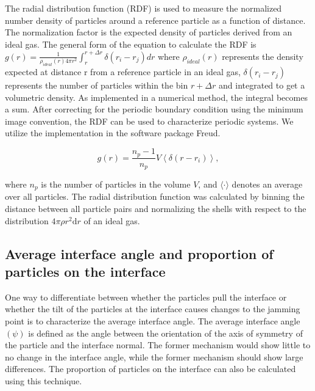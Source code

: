 The radial distribution function (RDF) is used to measure the normalized number density of particles around a 
reference particle as a function of distance. The normalization factor is the expected density of particles derived 
from an ideal gas. The general form of the equation to calculate the RDF is 
$g(r) = \frac{1}{\rho_{ideal}(r) 4\pi r^2} \int_{r}^{r+\Delta r} \delta(r_{i} - r_{j}) dr$ where $\rho_{ideal}(r)$ 
represents the density expected at distance r from a reference particle in an ideal gas, $\delta(r_{i} - r_{j})$ 
represents the number of particles within the bin $r + \Delta r$ and integrated to get a volumetric density. 
As implemented in a numerical method, the integral becomes a sum. After correcting for the periodic boundary 
condition using the minimum image convention, the RDF can be used to characterize periodic systems. We utilize 
the implementation in the software package Freud. \cite{ramasubramani_freud_2020}

\begin{equation}
    g(r) = \frac{n_p-1}{n_p} V \left\langle\delta\left(r-r_i\right)\right\rangle ,
\end{equation}

where \(n_p\) is the number of particles in the volume
\(V\), and \(\langle\cdot\rangle\) denotes an average over all
particles. The radial distribution function was calculated by binning
the distance between all particle pairs and normalizing the shells with
respect to the distribution \(4\pi \rho r^2 \mathrm{d}r\) of an ideal
gas. 

\subsection{Average interface angle and proportion of particles on the interface}
\label{section:interface_angle}

One way to differentiate between whether the particles pull the interface or whether the tilt of the particles at 
the interface causes changes to the jamming point is to characterize the average interface angle. The average interface 
angle $(\psi)$ is defined as the angle between the orientation of the axis of symmetry of the particle and the interface 
normal. The former mechanism would show little to no change in the interface angle, while the former mechanism should 
show large differences. The proportion of particles on the interface can also be calculated using this technique. 

